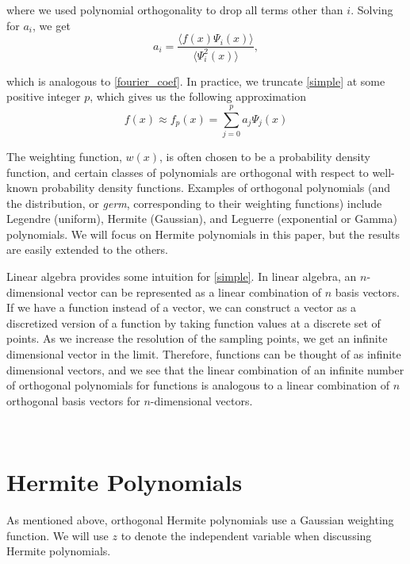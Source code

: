 \documentclass[11pt]{article}
\numberwithin{equation}{section}
\begin{document}
where we used polynomial orthogonality to drop all terms other than $i$. Solving for $a_i$, we get
\begin{equation}
a_i = \frac{\langle f(x) \Psi_i(x) \rangle }{\langle \Psi_i^2(x) \rangle}, \label{pc_coef}
\end{equation}

which is analogous to \eqref{fourier_coef}. In practice, we truncate \eqref{simple} at some positive integer $p$, which gives us the following approximation
\begin{equation}
f(x) \approx f_p(x) = \sum_{j=0}^{p}  a_j \Psi_j(x) \label{pce_trunc}
\end{equation}

\qquad The weighting function, $w(x)$, is often chosen to be a probability density function, and certain classes of polynomials are orthogonal with respect to well-known probability density functions. Examples of orthogonal polynomials (and the distribution, or {\em germ}, corresponding to their weighting functions) include Legendre (uniform), Hermite (Gaussian), and Leguerre (exponential or Gamma) polynomials. We will focus on Hermite polynomials in this paper, but the results are easily extended to the others. 

\qquad  Linear algebra provides some intuition for \eqref{simple}. In linear algebra, an $n$-dimensional vector can be represented as a linear combination of $n$ basis vectors. If we have a function instead of a vector, we can construct a vector as a discretized version of a function by taking function values at a discrete set of points. As we increase the resolution of the sampling points, we get an infinite dimensional vector in the limit. Therefore, functions can be thought of as infinite dimensional vectors, and we see that the linear combination of an infinite number of orthogonal polynomials for functions is analogous to a linear combination of $n$ orthogonal basis vectors for $n$-dimensional vectors. 

\





\section{Hermite Polynomials}

As mentioned above, orthogonal Hermite polynomials use a Gaussian weighting function. We will use $z$ to denote the independent variable when discussing Hermite polynomials.
\end{document}
